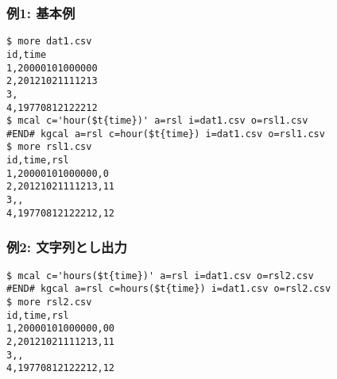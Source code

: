 \subsubsection*{例1: 基本例}



\begin{Verbatim}[baselinestretch=0.7,frame=single]
$ more dat1.csv
id,time
1,20000101000000
2,20121021111213
3,
4,19770812122212
$ mcal c='hour($t{time})' a=rsl i=dat1.csv o=rsl1.csv
#END# kgcal a=rsl c=hour($t{time}) i=dat1.csv o=rsl1.csv
$ more rsl1.csv
id,time,rsl
1,20000101000000,0
2,20121021111213,11
3,,
4,19770812122212,12
\end{Verbatim}
\subsubsection*{例2: 文字列とし出力}



\begin{Verbatim}[baselinestretch=0.7,frame=single]
$ mcal c='hours($t{time})' a=rsl i=dat1.csv o=rsl2.csv
#END# kgcal a=rsl c=hours($t{time}) i=dat1.csv o=rsl2.csv
$ more rsl2.csv
id,time,rsl
1,20000101000000,00
2,20121021111213,11
3,,
4,19770812122212,12
\end{Verbatim}
